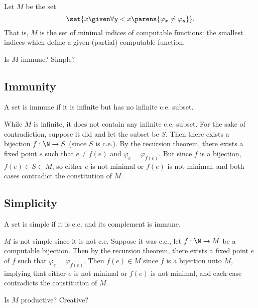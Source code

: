 \begin{problem}
  Let $M$ be the set
  \[ \set{ x \given \forall y < x \parens{ \varphi_x \neq \varphi_y } }. \]
  That is, $M$ is the set of minimal indices of computable functions:
  the smallest indices which define a given (partial) computable function.

  \begin{enumalph}
    \item Is $M$ immune? Simple?
      \begin{answer}

        \subsection*{Immunity}
        A set is immune if it is infinite but has no infinite c.e. subset.

        While $M$ is infinite, it does not contain any infinite c.e. subset.
        For the sake of contradiction, suppose it did
        and let the subset be $S$.
        Then there exists a bijection $f : \N \to S$ (since $S$ is c.e.).
        By the recursion theorem, there exists a fixed point $e$
        such that $e \neq f(e)$ and $\varphi_e = \varphi_{f(e)}$.
        But since $f$ is a bijection, $f(e) \in S \subset M$,
        so either $e$ is not minimal or $f(e)$ is not minimal,
        and both cases contradict the constitution of $M$.

        \subsection*{Simplicity}
        A set is simple if it is c.e. and its complement is immune.

        $M$ is not simple since it is not c.e.
        Suppose it was c.e., let $f : \N \to M$ be a computable bijection.
        Then by the recursion theorem, there exists a fixed point $e$
        of $f$ such that $\varphi_e = \varphi_{f(e)}$.
        Then $f(e) \in M$ since $f$ is a bijection unto $M$,
        implying that either $e$ is not minimal or $f(e)$ is not minimal,
        and each case contradicts the constitution of $M$.
        
      \end{answer}
    \newpage
    \item Is $M$ productive? Creative?
      \begin{answer}



\end{answer}
\end{enumalph}
\end{problem}
